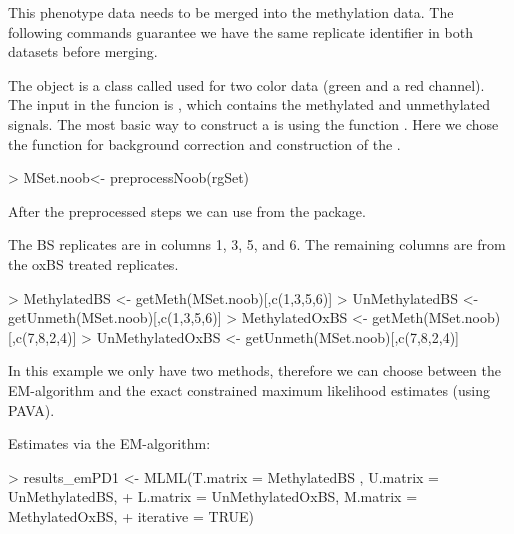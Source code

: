 \documentclass{article}
\begin{document}


This phenotype data needs to be merged into the methylation data. The following commands guarantee we have the same replicate identifier in both datasets before merging.

\begin{Schunk}
\end{Schunk}

The  object is a class called  used for two color data (green and a red channel). The input in the  funcion is  , which contains the methylated and unmethylated signals. The most basic way to construct a  is  using the function . Here we chose the function  for background correction and construction of the .


\begin{Schunk}
\begin{Sinput}
> MSet.noob<- preprocessNoob(rgSet)
\end{Sinput}
\end{Schunk}


After the preprocessed steps we can use  from the  package.


The BS replicates are in columns 1, 3, 5, and 6. The remaining columns are from the oxBS treated replicates.

\begin{Schunk}
\begin{Sinput}
> MethylatedBS <- getMeth(MSet.noob)[,c(1,3,5,6)]
> UnMethylatedBS <- getUnmeth(MSet.noob)[,c(1,3,5,6)]
> MethylatedOxBS <- getMeth(MSet.noob)[,c(7,8,2,4)]
> UnMethylatedOxBS <- getUnmeth(MSet.noob)[,c(7,8,2,4)]
\end{Sinput}
\end{Schunk}


In this example we only have two methods, therefore we can choose between the EM-algorithm and the exact constrained maximum likelihood estimates (using PAVA).

Estimates via the EM-algorithm:

\begin{Schunk}
\begin{Sinput}
> results_emPD1 <- MLML(T.matrix = MethylatedBS , U.matrix = UnMethylatedBS,
+                    L.matrix = UnMethylatedOxBS, M.matrix = MethylatedOxBS,
+                    iterative = TRUE)
\end{Sinput}
\end{Schunk}
\end{document}
